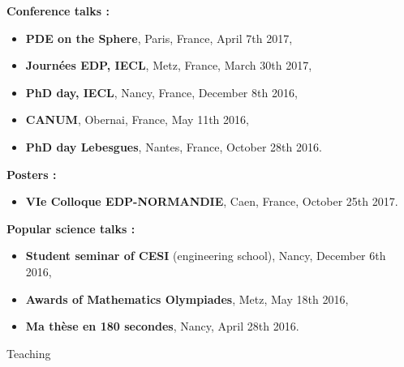\documentclass[10pt,a4paper]{report}
\begin{document}
\vspace{0.3cm}
\noindent
{\selectfont
\textbf{Conference talks :}
}

\begin{itemize}
\item \textbf{PDE on the Sphere}, Paris, France, April 7th 2017,
\item \textbf{Journées EDP, IECL}, Metz, France, March 30th 2017,
\item \textbf{PhD day, IECL}, Nancy, France, December 8th 2016,
\item \textbf{CANUM}, Obernai, France, May 11th 2016,
\item \textbf{PhD day Lebesgues}, Nantes, France, October 28th 2016.
\end{itemize}

\vspace{0.3cm}
\noindent
{\selectfont
\textbf{Posters :}
}

\begin{itemize}
\item \textbf{VIe Colloque EDP-NORMANDIE}, Caen, France, October 25th 2017.
\end{itemize}


\vspace{0.3cm}
\noindent
{\selectfont
\textbf{Popular science talks :}
}
\begin{itemize}
\item \textbf{Student seminar of CESI }(engineering school), Nancy, December 6th 2016,
\item \textbf{Awards of Mathematics Olympiades}, Metz, May 18th 2016,
\item \textbf{Ma thèse en 180 secondes}, Nancy, April 28th 2016.
\end{itemize}

\vspace{.5cm}
\noindent
{\selectfont
\begin{Large}
Teaching
\end{Large}
\hrulefill
}
\end{document}
